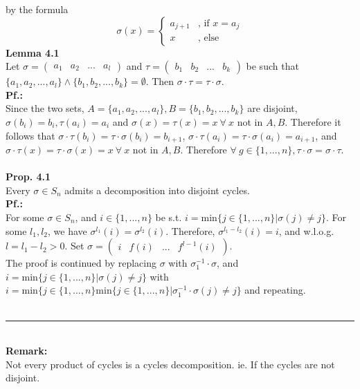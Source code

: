 \documentclass{article}
\begin{document}
 by the formula 
 \begin{equation}
 \sigma(x)=
	 \begin{cases}
 			a_{j+1} &\text{, if }x=a_j \\
 			x &\text{, else}
	 \end{cases}
 \end{equation}
\textbf{Lemma 4.1}\\
Let $\sigma=\begin{pmatrix}
a_1&a_2&...&a_l
\end{pmatrix}$
and $\tau = \begin{pmatrix}
b_1&b_2&...&b_k
\end{pmatrix}$ be such that $\lbrace a_1,a_2,...,a_l\rbrace \wedge \lbrace b_1,b_2,...,b_k\rbrace = \emptyset$. Then $\sigma\cdot \tau=\tau\cdot\sigma$.
\vspace{2mm}~\\
\textbf{Pf.:}\\
Since the two sets, $A=\lbrace a_1,a_2,...,a_l\rbrace,B=\lbrace b_1,b_2,...,b_k\rbrace$ are disjoint, $\sigma(b_i)=b_i,\tau(a_i)=a_i$ and $\sigma(x)=\tau(x)=x~\forall~x$ not in $A,B$. Therefore it follows that $\sigma\cdot\tau(b_i)=\tau\cdot\sigma(b_i)=b_{i+1}$, $\sigma\cdot\tau(a_i)=\tau\cdot\sigma(a_i)=a_{i+1}$, and $\sigma\cdot\tau(x)=\tau\cdot\sigma(x)=x~\forall~x$ not in $A,B$. Therefore $\forall ~ g\in \lbrace 1,...,n\rbrace,\tau\cdot\sigma=\sigma\cdot\tau$.\\
\vspace{2mm}~\\
\textbf{Prop. 4.1}\\
Every $\sigma \in S_n$ admits a decomposition into disjoint cycles.
\vspace{2mm}~\\
\textbf{Pf.:}\\
For some $\sigma\in S_n$, and $i\in\lbrace1,...,n\rbrace$ be s.t. $i=\mathrm{min}\lbrace j\in\lbrace1,...,n\rbrace|\sigma(j)\neq j\rbrace$. For some $l_1,l_2$, we have $\sigma^{l_1}(i)=\sigma^{l_2}(i)$. Therefore, $\sigma^{l_1-l_2}(i)=i$, and w.l.o.g. $l=l_1-l_2>0$. Set $\sigma=\begin{pmatrix}
i&f(i)&...&f^{l-1}(i)
\end{pmatrix}$.\\
The proof is continued by replacing $\sigma$ with $\sigma_1^{-1}\cdot\sigma$, and $i=\mathrm{min}\lbrace j \in\lbrace1,...,n\rbrace| \sigma(j)\neq j\rbrace$ with $i=\mathrm{min}\lbrace j\in \lbrace1,...,n\rbrace\mathrm{min}\lbrace j \in\lbrace1,...,n\rbrace|\sigma_1^{-1}\cdot\sigma(j)\neq j\rbrace$ and repeating.\\
\vspace{2mm}~\\
\hrule 
\vspace{2mm}~\\
\textbf{Remark:}\\Not every product of cycles is a cycles decomposition. ie. If the cycles are not disjoint.
\newpage
\end{document}
